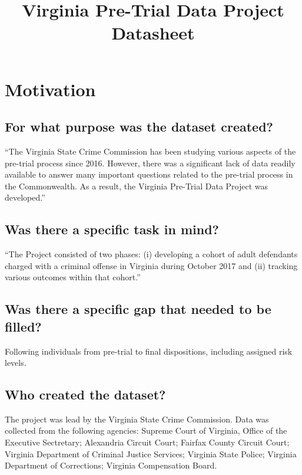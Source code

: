 \documentclass[letterpaper, 10 pt, conference]{ieeeconf}  %
\title{\LARGE \bf
Virginia Pre-Trial Data Project \\{\color{blue}Datasheet}
}
\begin{document}
\maketitle
\thispagestyle{empty}
\pagestyle{empty}

\section{Motivation}

\subsection{For what purpose was the dataset created?}

``The Virginia State Crime Commission has been studying various aspects of the pre-trial process since 2016.  However, there was a significant lack of data readily available to answer many important questions related to the pre-trial process in the Commonwealth. As a result, the Virginia Pre-Trial Data Project was developed.'' 

\subsection{Was there a specific task in mind?}

``The Project consisted of two phases: (i) developing a cohort of adult defendants charged with a criminal offense in Virginia during October 2017 and (ii) tracking various outcomes within that cohort.''

\subsection{Was there a specific gap that needed to be filled?}

Following individuals from pre-trial to final dispositions, including assigned risk levels.

\subsection{Who created the dataset? }

The project was lead by the Virginia State Crime Commission. Data was collected from the following agencies: 
Supreme Court of Virginia, Office of the Executive Sectretary; Alexandria Circuit Court; Fairfax County Circuit Court; Virginia Department of Criminal Justice Services;
Virginia State Police; Virginia Department of Corrections; Virginia Compensation Board.
\end{document}
